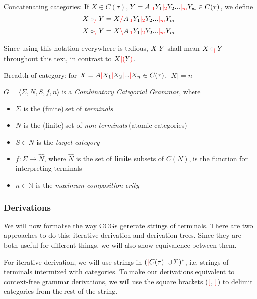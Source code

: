 \documentclass[main.tex]{subfiles}
\begin{document}
\begin{defn}
    Concatenating categories: If $X \in C(\tau)$,
    $Y = A \textcolor{red}{|_{1}} Y_1 \textcolor{red}{|_{2}} Y_2 ... \textcolor{red}{|_{m}} Y_m \in C(\tau)$, we define
    \[ X \circ_{\textcolor{red}{/}} Y = X \textcolor{red}{/} A \textcolor{red}{|_{1}} Y_1 \textcolor{red}{|_{2}} Y_2 ... \textcolor{red}{|_{m}} Y_m \]
    \[ X \circ_{\textcolor{red}{\backslash}} Y = X \textcolor{red}{\backslash} A \textcolor{red}{|_{1}} Y_1 \textcolor{red}{|_{2}} Y_2 ... \textcolor{red}{|_{m}} Y_m \]
\end{defn}

\begin{convention}
    Since using this notation everywhere is tedious, $X \textcolor{red}{|} Y$ shall mean
    $X \circ_{\textcolor{red}{|}} Y$ throughout this text, in contrast to
    $X \textcolor{red}{|} \textcolor{red}{(} Y \textcolor{red}{)}$.
\end{convention}

\begin{defn}
    Breadth of category: for $X = A \textcolor{red}{|} X_1 \textcolor{red}{|} X_2 \textcolor{red}{|} ... \textcolor{red}{|} X_n \in C(\tau)$,
    $|X| = n$.
\end{defn}

\begin{defn}
    $ G = \langle \Sigma, N, S, f, n \rangle $ is a \emph{Combinatory Categorial Grammar}, where
    \begin{itemize}
        \item $ \Sigma $ is the (finite) set of \emph{terminals}
        \item $ N $ is the (finite) set of \emph{non-terminals} (atomic categories)
        \item $ S \in N $ is the \emph{target category}
        \item $ f : \Sigma \rightarrow \hat{N} $, where $\hat{N}$ is the set of
            \textbf{finite} subsets of $C(N)$, is the function for interpreting
            terminals
        \item $ n \in \mathbb{N} $ is the \emph{maximum composition arity}
    \end{itemize}
\end{defn}

\subsubsection{Derivations}

We will now formalise the way CCGs generate strings of terminals. There
are two approaches to do this: iterative derivation and derivation trees. Since
they are both useful for different things, we will also show equivalence
between them.

For iterative derivation, we will use strings in $(\textcolor{red}{[} C(\tau) \textcolor{red}{]} \cup \Sigma)^*$,
i.e. strings of terminals intermixed with categories. To make our derivations
equivalent to context-free grammar derivations, we will use the square
brackets ($\textcolor{red}{[}$, $\textcolor{red}{]}$) to delimit categories from the rest of the string.
\end{document}
